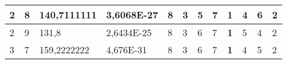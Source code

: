 \documentclass[conference]{IEEEtran}
\begin{document}
\begin{table*}[]
\begin{tabular}{|llll|llllllll|}
\multicolumn{1}{|l|}{2}                                                              & \multicolumn{1}{l|}{8}                                                                 & \multicolumn{1}{l|}{140,7111111}                                                           & 3,6068E-27                              & \multicolumn{1}{l|}{8}                                                           & \multicolumn{1}{l|}{3}                                                           & \multicolumn{1}{l|}{5}                                                           & \multicolumn{1}{l|}{7}                                                           & \multicolumn{1}{l|}{\textbf{1}}                                                  & \multicolumn{1}{l|}{4}                                                           & \multicolumn{1}{l|}{6}                                                           & 2                                   \\ \hline
\multicolumn{1}{|l|}{2}                                                              & \multicolumn{1}{l|}{9}                                                                 & \multicolumn{1}{l|}{131,8}                                                                 & 2,6434E-25                              & \multicolumn{1}{l|}{8}                                                           & \multicolumn{1}{l|}{3}                                                           & \multicolumn{1}{l|}{6}                                                           & \multicolumn{1}{l|}{7}                                                           & \multicolumn{1}{l|}{\textbf{1}}                                                  & \multicolumn{1}{l|}{5}                                                           & \multicolumn{1}{l|}{4}                                                           & 2                                   \\ \hline
\multicolumn{1}{|l|}{3}                                                              & \multicolumn{1}{l|}{7}                                                                 & \multicolumn{1}{l|}{159,2222222}                                                           & 4,676E-31                               & \multicolumn{1}{l|}{8}                                                           & \multicolumn{1}{l|}{3}                                                           & \multicolumn{1}{l|}{6}                                                           & \multicolumn{1}{l|}{7}                                                           & \multicolumn{1}{l|}{\textbf{1}}                                                  & \multicolumn{1}{l|}{4}                                                           & \multicolumn{1}{l|}{5}                                                           & 2                                   \\ \hline

\end{tabular}
\end{table*}
\end{document}
